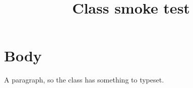\documentclass[conference]{IEEEtran}
\title{Class smoke test}
\author{\IEEEauthorblockN{CI}\IEEEauthorblockA{Continuous Integration}}
\begin{document}
\maketitle

\section{Body}
A paragraph, so the class has something to typeset.
\end{document}
